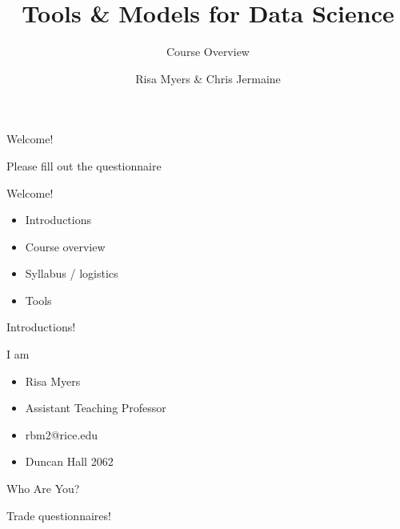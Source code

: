 \documentclass[aspectratio=169]{beamer}
\title[]
{Tools \& Models for Data Science}
\subtitle
{Course Overview}
\author[]{Risa Myers \& Chris Jermaine}
\institute
{
  Rice University
}
\date[]{}
\begin{document}
\begin{frame}
 \titlepage
\end{frame}


\begin{frame}{Welcome!}

\Large{Please fill out the questionnaire}
\vspace{1em}


\end{frame}

\begin{frame}{Welcome!}

\begin{itemize}
\item Introductions
\item Course overview
\item Syllabus / logistics
\item Tools
\end{itemize}
\end{frame}


\begin{frame}{Introductions!}

I am
\begin{itemize}
\item Risa Myers
\item Assistant Teaching Professor
\item rbm2@rice.edu
\item Duncan Hall  2062
\end{itemize}
\end{frame}


\begin{frame}{Who Are You?}

\Large{Trade questionnaires!}

\end{frame}

\end{document}
